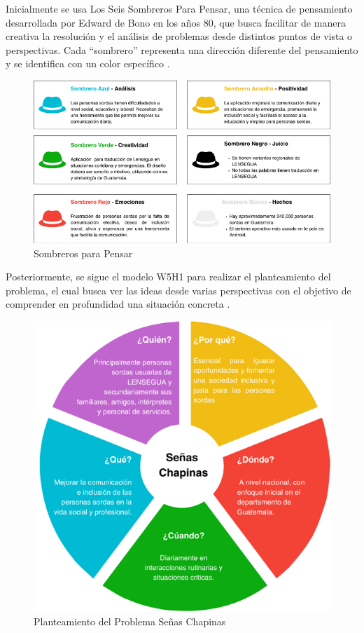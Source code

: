 Inicialmente se usa Los Seis Sombreros Para Pensar, una técnica de pensamiento desarrollada por Edward de Bono en los años 80, que busca facilitar de manera creativa la resolución y el análisis de problemas desde distintos puntos de vista o perspectivas. Cada ``sombrero'' representa una dirección diferente del pensamiento y se identifica con un color específico \cite{Santos2024}.

\begin{figure} [H]
    \centering
    \includegraphics[width=0.8\linewidth]{figuras/sombreros.png}
    \caption{Sombreros para Pensar}
    \label{fig:enter-label}
\end{figure}


Posteriormente, se sigue el modelo W5H1 para realizar el planteamiento del problema, el cual busca ver las ideas desde varias perspectivas con el objetivo de comprender en profundidad una situación concreta \cite{Artigas2017}.

\begin{figure} [H]
    \centering
    \includegraphics[width=0.6\linewidth]{figuras/w5h1.png}
    \caption{Planteamiento del Problema Señas Chapinas}
    \label{fig:enter-label}
\end{figure}

